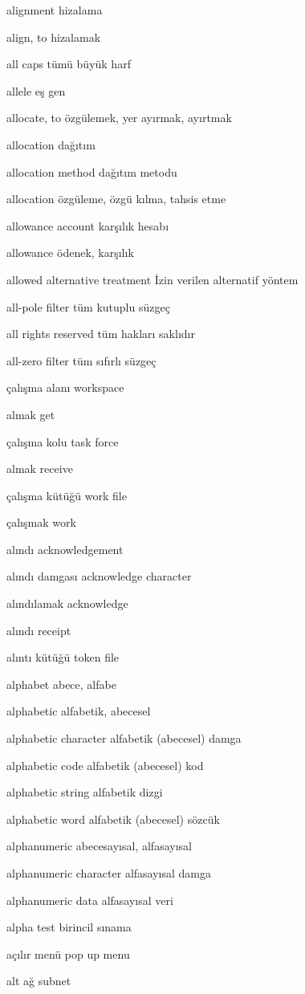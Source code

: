\documentclass[12pt,fleqn]{article}\usepackage{../../common}
\begin{document}
alignment hizalama

align, to hizalamak

all caps tümü büyük harf

allele eş gen

allocate, to özgülemek, yer ayırmak, ayırtmak

allocation dağıtım

allocation method dağıtım metodu

allocation özgüleme, özgü kılma, tahsis etme

allowance account karşılık hesabı

allowance ödenek, karşılık

allowed alternative treatment İzin verilen alternatif yöntem

all-pole filter tüm kutuplu süzgeç

all rights reserved tüm hakları saklıdır

all-zero filter tüm sıfırlı süzgeç

çalışma alanı workspace

almak get

çalışma kolu task force

almak receive

çalışma kütüğü work file

çalışmak work

alındı acknowledgement

alındı damgası acknowledge character

alındılamak acknowledge

alındı receipt

alıntı kütüğü token file

alphabet abece, alfabe

alphabetic alfabetik, abecesel

alphabetic character alfabetik (abecesel) damga

alphabetic code alfabetik (abecesel) kod

alphabetic string alfabetik dizgi

alphabetic word alfabetik (abecesel) sözcük

alphanumeric abecesayısal, alfasayısal

alphanumeric character alfasayısal damga

alphanumeric data alfasayısal veri

alpha test birincil sınama

açılır menü pop up menu

alt ağ subnet
\end{document}
